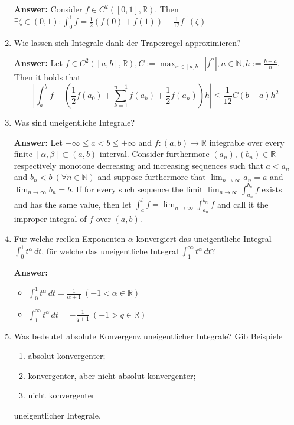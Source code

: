 \documentclass[11pt]{article}
\newcommand{\abs}[1]{\left|#1\right|}
\newcommand{\RR}[0]{\mathbb{R}}
\newcommand{\NN}[0]{\mathbb{N}}
\begin{document}
\begin{enumerate}
    \textbf{Answer:} Consider $f \in C^2([0, 1], \mathbb{R})$. Then $\exists \zeta \in (0, 1)\colon \int_0^1 f = \frac{1}{2}(f(0) + f(1))- \frac{1}{12}f^{\prime\prime}(\zeta)$

    \item Wie lassen sich Integrale dank der Trapezregel approximieren?

    \textbf{Answer:} Let $f \in C^2([a, b], \RR), C := \max_{x\in[a, b]}\abs{f^{\prime\prime}}, n \in \NN, h := \frac{b-a}{n}$. Then it holds that $$\abs{\int_a^b f - \left(\frac{1}{2}f(a_0) + \sum_{k=1}^{n-1}f(a_k) + \frac{1}{2}f(a_n)\right)h}\le \frac{1}{12}C(b-a)h^2$$
    \item Was sind uneigentliche Integrale?

    \textbf{Answer:} Let $-\infty \le a < b \le +\infty$ and $f\colon(a, b) \to \RR$ integrable over every finite $[\alpha, \beta] \subset (a, b)$ interval. Consider furthermore $(a_n), (b_n) \in \RR$ respectively monotone decreasing and increasing sequences such that $a < a_n$ and $b_n < b~(\forall n \in \NN)$ and suppose furthermore that $\lim_{n\to\infty}a_n = a$ and $\lim_{n\to\infty}b_n = b$. If for every such sequence the limit $\lim_{n\to\infty}\int_{a_n}^{b_n} f$ exists and has the same value, then let $\int_a^b f = \lim_{n\to\infty}\int_{a_n}^{b_n} f$ and call it the improper integral of $f$ over $(a, b)$.

    \item Für welche reellen Exponenten $\alpha$ konvergiert das uneigentliche Integral $\int_0^1t^\alpha\,dt$, für welche das uneigentliche Integral $\int_1^\infty t^\alpha \,dt$?

    \textbf{Answer:}
    \begin{itemize}
        \item $\int_0^1t^\alpha\,dt = \frac{1}{\alpha+1}~(-1 < \alpha \in \RR)$
        \item $\int_1^\infty t^\alpha \,dt = -\frac{1}{q+1}~(-1 > q \in \RR)$
    \end{itemize}

    \item Was bedeutet absolute Konvergenz uneigentlicher Integrale? Gib Beispiele
    \begin{enumerate}
        \item absolut konvergenter;
        \item konvergenter, aber nicht absolut konvergenter;
        \item nicht konvergenter
    \end{enumerate} uneigentlicher Integrale.


\end{enumerate}
\end{document}
